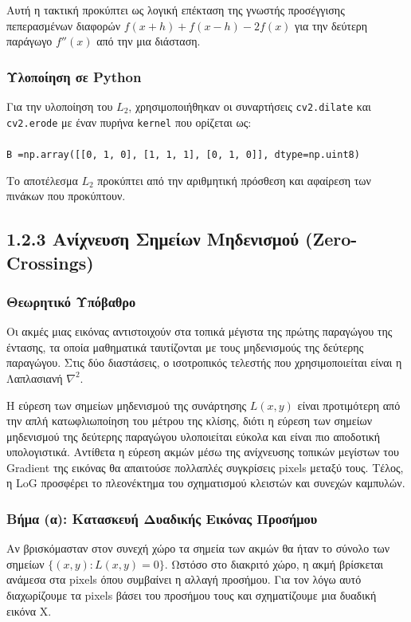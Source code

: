 \documentclass[12pt,a4paper]{article}
\begin{document}
Αυτή η τακτική προκύπτει ως λογική επέκταση της γνωστής προσέγγισης πεπερασμένων διαφορών $f(x+h) + f(x-h) - 2f(x)$ για την δεύτερη παράγωγο $f''(x)$ από την μια διάσταση.

\subsubsection*{Υλοποίηση σε \foreignlanguage{english}{Python}}
Για την υλοποίηση του $L_2$, χρησιμοποιήθηκαν οι συναρτήσεις \texttt{\foreignlanguage{english}{cv2.dilate}} και \texttt{\foreignlanguage{english}{cv2.erode}} με έναν πυρήνα \texttt{\foreignlanguage{english}{kernel}} που ορίζεται ως:
\\\\
\texttt{B =\foreignlanguage{english}{np.array}([[0, 1, 0],
        [1, 1, 1],
        [0, 1, 0]], \foreignlanguage{english}{dtype=np.uint8})}

Το αποτέλεσμα $L_2$ προκύπτει από την αριθμητική πρόσθεση και αφαίρεση των πινάκων που προκύπτουν.


\subsection*{1.2.3 Ανίχνευση Σημείων Μηδενισμού (\foreignlanguage{english}{Zero-Crossings})}

\subsubsection*{Θεωρητικό Υπόβαθρο}
\hspace{0.6cm}Οι ακμές μιας εικόνας αντιστοιχούν στα τοπικά μέγιστα της πρώτης παραγώγου της έντασης, τα οποία μαθηματικά ταυτίζονται με τους μηδενισμούς της δεύτερης παραγώγου. Στις δύο διαστάσεις, ο ισοτροπικός τελεστής που χρησιμοποιείται είναι η Λαπλασιανή $\nabla^2$. 

Η εύρεση των σημείων μηδενισμού της συνάρτησης $L(x,y)$ είναι προτιμότερη από την απλή κατωφλιωποίηση του μέτρου της κλίσης, διότι η εύρεση των σημείων μηδενισμού της δεύτερης παραγώγου υλοποιείται εύκολα και είναι πιο αποδοτική υπολογιστικά. Αντίθετα η εύρεση ακμών μέσω της ανίχνευσης τοπικών μεγίστων του \foreignlanguage{english}{Gradient} της εικόνας θα απαιτούσε πολλαπλές συγκρίσεις \foreignlanguage{english}{pixels} μεταξύ τους. Τέλος, η \foreignlanguage{english}{LoG} προσφέρει το πλεονέκτημα του σχηματισμού κλειστών και συνεχών καμπυλών.

\subsubsection*{Βήμα (α): Κατασκευή Δυαδικής Εικόνας Προσήμου}
\hspace{0.6cm}Αν βρισκόμασταν στον συνεχή χώρο τα σημεία των ακμών θα ήταν το σύνολο των σημείων $\{ (x,y) : L(x,y) = 0 \}$. Ωστόσο στο διακριτό χώρο, η ακμή βρίσκεται ανάμεσα στα \foreignlanguage{english}{pixels} όπου συμβαίνει η αλλαγή προσήμου. Για τον λόγω αυτό διαχωρίζουμε τα \foreignlanguage{english}{pixels} βάσει του προσήμου τους και σχηματίζουμε μια δυαδική εικόνα Χ.
\end{document}
